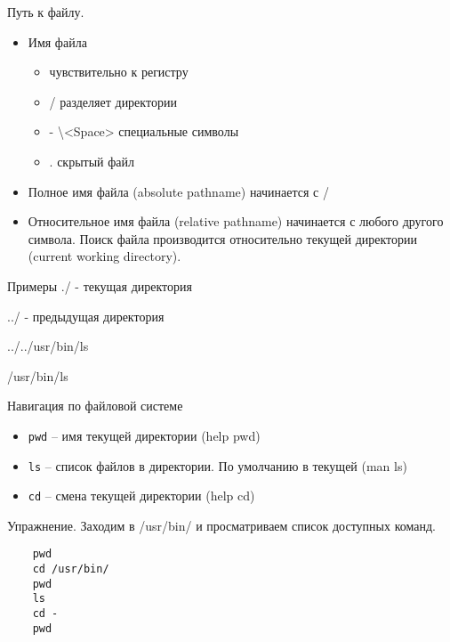 \begin{frame}[fragile]{Путь к файлу.}
      \begin{itemize}
        \item Имя файла
                \begin{itemize}
                    \item чувствительно к регистру
                    \item / разделяет директории
                    \item - \textbackslash <Space> специальные символы 
                    \item . скрытый файл
                \end{itemize}
        \item \alert{Полное имя файла} (absolute pathname) начинается с /
        \item \alert{Относительное имя файла} (relative pathname) начинается с
        любого другого символа. Поиск файла производится относительно
        \alert{текущей директории} (current working directory).
      \end{itemize}

      \begin{block}{Примеры}
        ./ - текущая директория

        ../ - предыдущая директория

        ../../usr/bin/ls

        /usr/bin/ls
      \end{block}
\end{frame}

\begin{frame}[fragile]{Навигация по файловой системе}
      \begin{itemize}
		  \item {\tt pwd} -- имя текущей директории (help pwd)
		  \item {\tt ls} -- список файлов в директории. По умолчанию в текущей (man ls)
		  \item {\tt cd} -- смена текущей директории (help cd)
      \end{itemize}
      \begin{block}{Упражнение. Заходим в /usr/bin/ и просматриваем список доступных команд.}
	\begin{lstlisting}
	pwd
	cd /usr/bin/
	pwd
	ls
	cd -	
	pwd
	\end{lstlisting}
      \end{block}
\end{frame}

